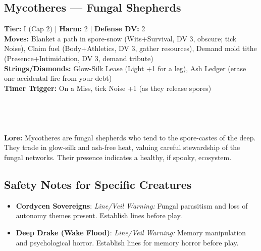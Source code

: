 \documentclass[11pt]{article}
\begin{document}
\subsection*{Mycotheres --- Fungal Shepherds}
\textbf{Tier:} I (Cap 2) | \textbf{Harm:} 2 | \textbf{Defense DV:} 2 \\
\textbf{Moves:} Blanket a path in spore-snow (Wits+Survival, DV 3, obscure; tick Noise), Claim fuel (Body+Athletics, DV 3, gather resources), Demand mold tithe (Presence+Intimidation, DV 3, demand tribute) \\
\textbf{Strings/Diamonds:} Glow-Silk Lease (Light +1 for a leg), Ash Ledger (erase one accidental fire from your debt) \\
\textbf{Timer Trigger:} On a Miss, tick Noise +1 (as they release spores) \\
 \\
 \\
 \\
 \\
\textbf{Lore:} Mycotheres are fungal shepherds who tend to the spore-castes of the deep. They trade in glow-silk and ash-free heat, valuing careful stewardship of the fungal networks. Their presence indicates a healthy, if spooky, ecosystem.


\subsection*{Safety Notes for Specific Creatures}
\begin{itemize}
    \item \textbf{Cordycen Sovereigns}: \textit{Line/Veil Warning:} Fungal parasitism and loss of autonomy themes present. Establish lines before play.
    \item \textbf{Deep Drake (Wake Flood)}: \textit{Line/Veil Warning:} Memory manipulation and psychological horror. Establish lines for memory horror before play.
\end{itemize}
\end{document}
